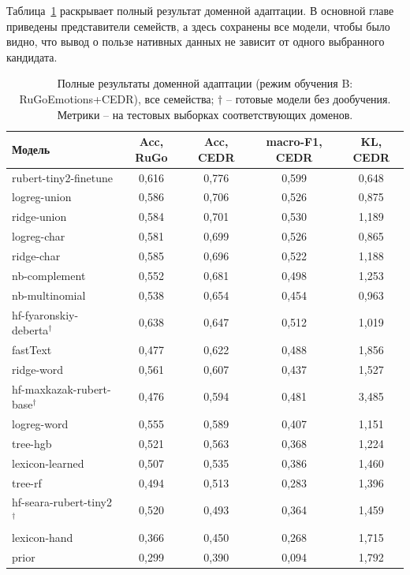\documentclass[12pt,a4paper]{report}
\begin{document}
Таблица~\ref{tab:da-full} раскрывает полный результат доменной адаптации. В основной главе приведены представители семейств, а здесь сохранены все модели, чтобы было видно, что вывод о пользе нативных данных не зависит от одного выбранного кандидата.

\begin{table}[H]
  \caption{Полные результаты доменной адаптации (режим обучения B: RuGoEmotions+CEDR), все семейства; \(\dagger\) -- готовые модели без дообучения. Метрики -- на тестовых выборках соответствующих доменов.}
  \label{tab:da-full}
  \centering
  {\scriptsize
  \begin{tabular}{|p{4.2cm}|c|c|c|c|}
    \hline
    Модель & Acc, RuGo & Acc, CEDR & macro-F1, CEDR & KL, CEDR \\
    \hline
    rubert-tiny2-finetune & 0{,}616 & 0{,}776 & 0{,}599 & 0{,}648 \\
    \hline
    logreg-union & 0{,}586 & 0{,}706 & 0{,}526 & 0{,}875 \\
    \hline
    ridge-union & 0{,}584 & 0{,}701 & 0{,}530 & 1{,}189 \\
    \hline
    logreg-char & 0{,}581 & 0{,}699 & 0{,}526 & 0{,}865 \\
    \hline
    ridge-char & 0{,}585 & 0{,}696 & 0{,}522 & 1{,}188 \\
    \hline
    nb-complement & 0{,}552 & 0{,}681 & 0{,}498 & 1{,}253 \\
    \hline
    nb-multinomial & 0{,}538 & 0{,}654 & 0{,}454 & 0{,}963 \\
    \hline
    hf-fyaronskiy-deberta\(^{\dagger}\) & 0{,}638 & 0{,}647 & 0{,}512 & 1{,}019 \\
    \hline
    fastText & 0{,}477 & 0{,}622 & 0{,}488 & 1{,}856 \\
    \hline
    ridge-word & 0{,}561 & 0{,}607 & 0{,}437 & 1{,}527 \\
    \hline
    hf-maxkazak-rubert-base\(^{\dagger}\) & 0{,}476 & 0{,}594 & 0{,}481 & 3{,}485 \\
    \hline
    logreg-word & 0{,}555 & 0{,}589 & 0{,}407 & 1{,}151 \\
    \hline
    tree-hgb & 0{,}521 & 0{,}563 & 0{,}368 & 1{,}224 \\
    \hline
    lexicon-learned & 0{,}507 & 0{,}535 & 0{,}386 & 1{,}460 \\
    \hline
    tree-rf & 0{,}494 & 0{,}513 & 0{,}283 & 1{,}396 \\
    \hline
    hf-seara-rubert-tiny2\(^{\dagger}\) & 0{,}520 & 0{,}493 & 0{,}364 & 1{,}459 \\
    \hline
    lexicon-hand & 0{,}366 & 0{,}450 & 0{,}268 & 1{,}715 \\
    \hline
    prior & 0{,}299 & 0{,}390 & 0{,}094 & 1{,}792 \\
    \hline
  \end{tabular}
  }
\end{table}
\end{document}
